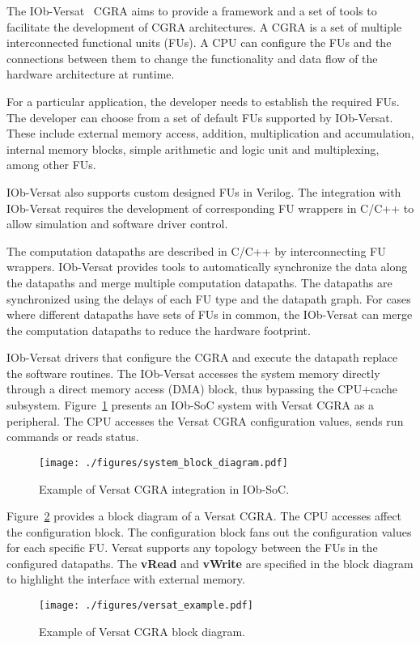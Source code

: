 The IOb-Versat~\cite{iob-versat} CGRA aims to provide a framework and a set of
tools to facilitate the development of CGRA architectures. A CGRA is a set of
multiple interconnected functional units (FUs). A CPU can configure the FUs and
the connections between them to change the functionality and data flow of the
hardware architecture at runtime.

For a particular application, the developer needs to establish the required
FUs. The developer can choose from a set of default FUs supported by
IOb-Versat. These include external memory access, addition, multiplication and
accumulation, internal memory blocks, simple arithmetic and logic unit and
multiplexing, among other FUs.

IOb-Versat also supports custom designed FUs in Verilog. The integration with
IOb-Versat requires the development of corresponding FU wrappers in C/C++ to
allow simulation and software driver control.

The computation datapaths are described in C/C++ by interconnecting FU
wrappers. IOb-Versat provides tools to automatically synchronize the data along
the datapaths and merge multiple computation datapaths. The datapaths are
synchronized using the delays of each FU type and the datapath graph. For cases
where different datapaths have sets of FUs in common, the IOb-Versat can merge
the computation datapaths to reduce the hardware footprint.

IOb-Versat drivers that configure the CGRA and execute the datapath replace the
software routines. The IOb-Versat accesses the system memory directly through a
direct memory access (DMA) block, thus bypassing the CPU+cache subsystem.
Figure~\ref{fig:system_versat} presents an IOb-SoC system with Versat CGRA as a
peripheral. The CPU accesses the Versat CGRA configuration values, sends run
commands or reads status. 

\begin{figure}[!htbp]
    \centerline{\texttt{[image: ./figures/system\_block\_diagram.pdf]}}
    \vspace{0cm}\caption{Example of Versat CGRA integration in IOb-SoC.}
    \label{fig:system_versat}
\end{figure}

Figure~\ref{fig:versat_bd} provides a block diagram of a Versat CGRA. The CPU 
accesses affect the configuration block. The configuration block fans out the 
configuration values for each specific FU. Versat supports any topology between
the FUs in the configured datapaths. The \textbf{vRead} and \textbf{vWrite} are
specified in the block diagram to highlight the interface with external memory.

\begin{figure}[!htbp]
    \centerline{\texttt{[image: ./figures/versat\_example.pdf]}}
    \vspace{0cm}\caption{Example of Versat CGRA block diagram.}
    \label{fig:versat_bd}
\end{figure}

